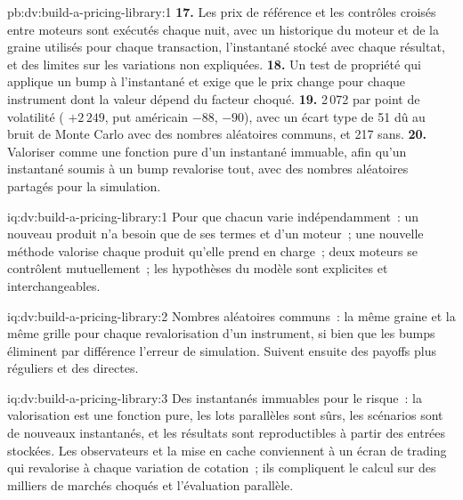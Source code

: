 \begin{solution}{pb:dv:build-a-pricing-library:1}
\textbf{17.} Les prix de référence et les contrôles croisés entre moteurs sont exécutés chaque nuit, avec un historique du moteur et de la graine utilisés pour chaque
transaction, l'instantané stocké avec chaque résultat, et des limites sur les variations non expliquées.
\textbf{18.} Un test de propriété qui applique un bump à l'instantané et exige que le prix change pour chaque instrument dont la valeur dépend du facteur choqué.
\textbf{19.} 2\,072 par point de volatilité ( $+2\,249$, put américain $-88$,  $-90$), avec un écart type de 51 dû au bruit de Monte Carlo
avec des nombres aléatoires communs, et 217 sans.
\textbf{20.} Valoriser comme une fonction pure d'un instantané immuable, afin qu'un instantané soumis à un bump revalorise tout, avec des nombres aléatoires partagés pour la simulation.
\end{solution}

\begin{solution}{iq:dv:build-a-pricing-library:1}
Pour que chacun varie indépendamment~: un nouveau produit n'a besoin que de ses termes et d'un moteur~; une nouvelle méthode valorise chaque produit qu'elle prend en charge~;
deux moteurs se contrôlent mutuellement~; les hypothèses du modèle sont explicites et interchangeables.
\end{solution}

\begin{solution}{iq:dv:build-a-pricing-library:2}
Nombres aléatoires communs~: la même graine et la même grille pour chaque revalorisation d'un instrument, si bien que les bumps éliminent par différence l'erreur de simulation.
Suivent ensuite des payoffs plus réguliers et des  directes.
\end{solution}

\begin{solution}{iq:dv:build-a-pricing-library:3}
Des instantanés immuables pour le risque~: la valorisation est une fonction pure, les lots parallèles sont sûrs, les scénarios sont de nouveaux instantanés, et les résultats sont reproductibles à partir des entrées stockées.
Les observateurs et la mise en cache conviennent à un écran de trading qui revalorise à chaque variation de cotation~; ils compliquent le calcul sur des milliers de marchés choqués et l'évaluation parallèle.
\end{solution}

